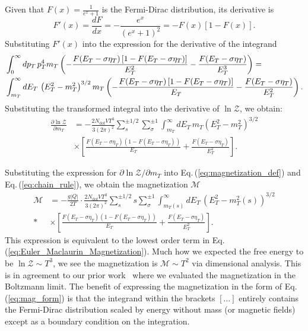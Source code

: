 \documentclass[epjST]{svjour}
\newcommand{\req}[1]{Eq.\,(\ref{#1})}
\numberwithin{equation}{section}
\begin{document}
Given that \( F(x) = \frac{1}{e^{x} + 1} \) is the Fermi-Dirac distribution, its derivative is
\begin{equation}
F'(x) = \frac{dF}{dx} = -\frac{e^{x}}{(e^{x} + 1)^2} = -F(x)\left[1 - F(x)\right].
\end{equation}
Substituting \( F'(x) \) into the expression for the derivative of the integrand
\begin{align}
    \notag
    &\int_{0}^{\infty} dp_{T} \, p_{T}^{4} m_{T} \left( -\frac{F(E_{T} - \sigma\eta_{T})\left[1 - F(E_{T} - \sigma\eta_{T})\right]}{E_{T}^{2}} - \frac{F(E_{T} - \sigma\eta_{T})}{E_{T}^{3}} \right) =\\*
    &\int_{m_{T}}^{\infty} dE_{T} \, \left(E_{T}^{2} - m_{T}^{2}\right)^{3/2} m_{T} \left( -\frac{F(E_{T} - \sigma\eta_{T})\left[1 - F(E_{T} - \sigma\eta_{T})\right]}{E_{T}} - \frac{F(E_{T} - \sigma\eta_{T})}{E_{T}^{2}} \right).
\end{align}
Substituting the transformed integral into the derivative of \(\ln \mathcal{Z}\), we obtain:
\begin{align}
    \frac{\partial \ln \mathcal{Z}}{\partial m_{T}} &= -\frac{2 N_{\mathrm{dof}} V T^{3}}{3 (2\pi)^{2}} \sum_{s}^{\pm1/2}\sum_{\sigma}^{\pm1} \int_{m_{T}}^{\infty} dE_{T} \, m_{T}\left(E_{T}^{2} - m_{T}^{2}\right)^{3/2}\\
    &\times\left[ \frac{F(E_{T} - \sigma\eta_{T})\left(1 - F(E_{T} - \sigma\eta_{T})\right)}{E_{T}} + \frac{F(E_{T} - \sigma\eta_{T})}{E_{T}^{2}} \right].
\end{align}

Substituting the expression for \(\partial \ln \mathcal{Z}/\partial m_{T}\) into \req{eq:magnetization_def} and \req{eq:chain_rule}, we obtain the magnetization \(\mathcal{M}\)
\begin{align}
    \label{eq:mag_form}
    \mathcal{M} &= -\frac{g|Q|}{2 T}\cdot\frac{2 N_{\mathrm{dof}} V T^{3}}{3 (2\pi)^{2}} \sum_{s}^{\pm1/2} s \sum_{\sigma}^{\pm1} \int_{m_{T}(s)}^{\infty} dE_{T} \, \left(E_{T}^{2} - m_{T}^{2}(s)\right)^{3/2} \\*
    &\times\left[ \frac{F(E_{T} - \sigma\eta_{T})\left(1 - F(E_{T} - \sigma\eta_{T})\right)}{E_{T}} + \frac{F(E_{T} - \sigma\eta_{T})}{E_{T}^{2}} \right].
\end{align}
This expression is equivalent to the lowest order term in \req{eq:Euler_Maclaurin_Magnetization}. Much how we expected the free energy to be \(\ln\mathcal{Z}\sim T^{3}\), we see the magnetization is \(\mathcal{M}\sim T^{2}\) via dimensional analysis. This is in agreement to our prior work~\cite{Steinmetz:2023nsc,Steinmetz:2023ucp,Rafelski:2024fej} where we evaluated the magnetization in the Boltzmann limit. The benefit of expressing the magnetization in the form of \req{eq:mag_form} is that the integrand within the brackets \([\ldots]\) entirely contains the Fermi-Dirac distribution scaled by energy without mass (or magnetic fields) except as a boundary condition on the integration.

\end{document}
